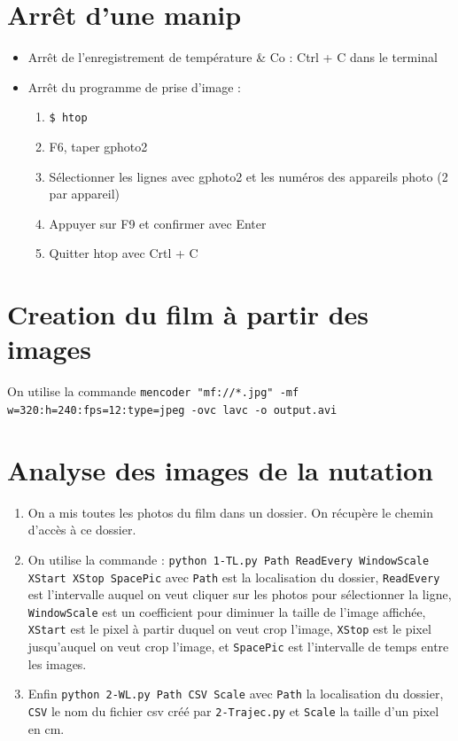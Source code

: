 \documentclass[10pt,a4paper]{article}
\begin{document}
\section{Arrêt d'une manip}
\begin{itemize}
\item Arrêt de l'enregistrement de température \& Co : Ctrl + C dans le terminal
\item Arrêt du programme de prise d'image : 
	\begin{enumerate}
	\item \texttt{\$ htop}
	\item F6, taper gphoto2
	\item Sélectionner les lignes avec gphoto2 et les numéros des appareils photo (2 par appareil)
	\item Appuyer sur F9 et confirmer avec Enter
	\item Quitter htop avec Crtl + C
	\end{enumerate}
\end{itemize}

\section{Creation du film à partir des images\label{film}}
On utilise la commande \texttt{mencoder "mf://*.jpg" -mf w=320:h=240:fps=12:type=jpeg -ovc lavc -o output.avi}


\section{Analyse des images de la nutation\label{anaNut}}
\begin{enumerate}
    \item On a mis toutes les photos du film dans un dossier. On récupère le chemin d'accès à ce dossier.
    \item On utilise la commande : \texttt{python 1-TL.py Path ReadEvery WindowScale XStart XStop SpacePic} avec \texttt{Path} est la localisation du dossier, \texttt{ReadEvery} est l'intervalle auquel on veut cliquer sur les photos pour sélectionner la ligne, \texttt{WindowScale} est un coefficient pour diminuer la taille de l'image affichée, \texttt{XStart} est le pixel à partir duquel on veut crop l'image, \texttt{XStop} est le pixel jusqu'auquel on veut crop l'image, et \texttt{SpacePic} est l'intervalle de temps entre les images.
    \item Enfin \texttt{python 2-WL.py Path CSV Scale} avec \texttt{Path} la localisation du dossier, \texttt{CSV} le nom du fichier csv créé par \texttt{2-Trajec.py} et \texttt{Scale} la taille d'un pixel en cm.
\end{enumerate}
\end{document}
